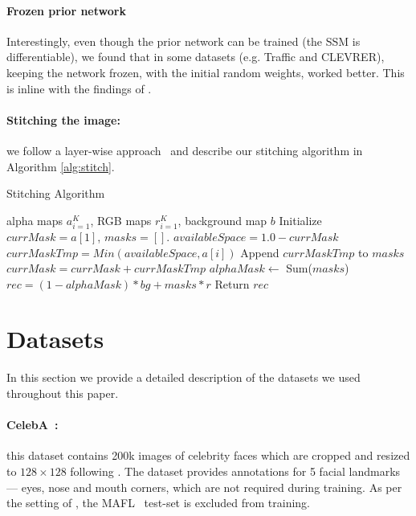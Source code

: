 \documentclass[nohyperref]{article}
\theoremstyle{plain}
\theoremstyle{definition}
\theoremstyle{remark}
\begin{document}
\paragraph{Frozen prior network} Interestingly, even though the prior network can be trained (the SSM is differentiable), we found that in some datasets (e.g. Traffic and CLEVRER), keeping the network frozen, with the initial random weights, worked better. This is inline with the findings of \citet{frankle2020training}.

\paragraph{Stitching the image:} we follow a layer-wise approach~\citep{smirnov2021marionette} and describe our stitching algorithm in Algorithm \ref{alg:stitch}.

\begin{algorithm}[tb]
  \caption{Stitching Algorithm}
  \label{alg:stitch}
\begin{algorithmic}
   alpha maps ${a}_{i=1}^K$,  RGB maps ${r}_{i=1}^K$, background map $b$
\STATE Initialize $currMask = a[1]$, $masks = []$.
  \STATE $availableSpace = 1.0 - currMask$
  \STATE $currMaskTmp = Min(availableSpace, a[i])$
  \STATE Append $currMaskTmp$ to $masks$
  \STATE $currMask = currMask + currMaskTmp$
  \ENDFOR
  \STATE $alphaMask \leftarrow$ Sum($masks$)
  \STATE $rec = (1 - alphaMask) * bg + masks * r$
  \STATE Return $rec$
\end{algorithmic}
\end{algorithm}

\section{Datasets}
\label{apndx:data}
In this section we provide a detailed description of the datasets we used throughout this paper.

\paragraph{CelebA~\cite{liu2015faceattributes}:} this dataset contains 200k images of celebrity faces which are cropped and resized to $128\times128$ following \citet{jakab2018unsupervised, thewlis2017unsupervised1}. The dataset provides
annotations for 5 facial landmarks — eyes, nose and mouth corners, which are not required during training. As per the setting of \cite{jakab2018unsupervised, thewlis2017unsupervised1}, the MAFL~\citep{zhang2014facial} test-set is excluded from training.
\end{document}
